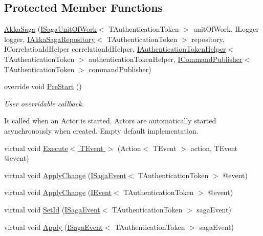\subsection*{Protected Member Functions}
\begin{DoxyCompactItemize}
\item 
\hyperlink{classCqrs_1_1Akka_1_1Domain_1_1AkkaSaga_a2f0ebb5d1d22e3112d5b9a09fde7fb47}{Akka\+Saga} (\hyperlink{interfaceCqrs_1_1Domain_1_1ISagaUnitOfWork}{I\+Saga\+Unit\+Of\+Work}$<$ T\+Authentication\+Token $>$ unit\+Of\+Work, I\+Logger logger, \hyperlink{interfaceCqrs_1_1Akka_1_1Domain_1_1IAkkaSagaRepository}{I\+Akka\+Saga\+Repository}$<$ T\+Authentication\+Token $>$ repository, I\+Correlation\+Id\+Helper correlation\+Id\+Helper, \hyperlink{interfaceCqrs_1_1Authentication_1_1IAuthenticationTokenHelper}{I\+Authentication\+Token\+Helper}$<$ T\+Authentication\+Token $>$ authentication\+Token\+Helper, \hyperlink{interfaceCqrs_1_1Commands_1_1ICommandPublisher}{I\+Command\+Publisher}$<$ T\+Authentication\+Token $>$ command\+Publisher)
\item 
override void \hyperlink{classCqrs_1_1Akka_1_1Domain_1_1AkkaSaga_a4615beae56f595074f3ba643a890ba74}{Pre\+Start} ()
\begin{DoxyCompactList}\small\item\em User overridable callback. 

Is called when an Actor is started. Actors are automatically started asynchronously when created. Empty default implementation. \end{DoxyCompactList}\item 
virtual void \hyperlink{classCqrs_1_1Akka_1_1Domain_1_1AkkaSaga_ac0782ac0b7e28418a52cead1b7b8b0c3}{Execute$<$ T\+Event $>$} (Action$<$ T\+Event $>$ action, T\+Event @event)
\item 
virtual void \hyperlink{classCqrs_1_1Akka_1_1Domain_1_1AkkaSaga_a42126a6a1a7896d16412b6023f208f7c}{Apply\+Change} (\hyperlink{interfaceCqrs_1_1Events_1_1ISagaEvent}{I\+Saga\+Event}$<$ T\+Authentication\+Token $>$ @event)
\item 
virtual void \hyperlink{classCqrs_1_1Akka_1_1Domain_1_1AkkaSaga_a18d554cd5ad329ab152efb7d852f2438}{Apply\+Change} (\hyperlink{interfaceCqrs_1_1Events_1_1IEvent}{I\+Event}$<$ T\+Authentication\+Token $>$ @event)
\item 
virtual void \hyperlink{classCqrs_1_1Akka_1_1Domain_1_1AkkaSaga_a3f3cf1a10203a1eead599e7529d41613}{Set\+Id} (\hyperlink{interfaceCqrs_1_1Events_1_1ISagaEvent}{I\+Saga\+Event}$<$ T\+Authentication\+Token $>$ saga\+Event)
\item 
virtual void \hyperlink{classCqrs_1_1Akka_1_1Domain_1_1AkkaSaga_a4a12310825f2d2cc5963eee4cc4ed802}{Apply} (\hyperlink{interfaceCqrs_1_1Events_1_1ISagaEvent}{I\+Saga\+Event}$<$ T\+Authentication\+Token $>$ saga\+Event)
\end{DoxyCompactItemize}
